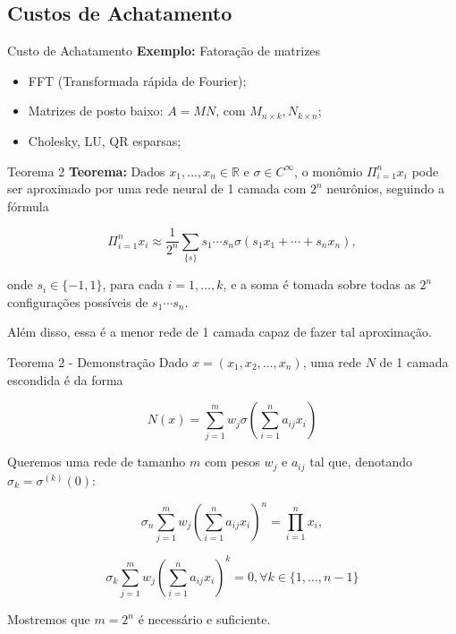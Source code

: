 \documentclass{beamer}
\begin{document}
\subsection{Custos de Achatamento}
\begin{frame}
    \tableofcontents[currentsection]
\end{frame}

\begin{frame}{Custo de Achatamento}
    \textbf{Exemplo:} Fatoração de matrizes
    \begin{itemize}
        \item FFT (Transformada rápida de Fourier);
        \item Matrizes de posto baixo: $A = MN$, com $M_{n\times k}, N_{k \times n}$;
        \item Cholesky, LU, QR esparsas;  
    \end{itemize}
\end{frame}

\begin{frame}{Teorema 2}
    \textbf{Teorema:} Dados $x_1,\dots,x_n \in \mathbb R$ e $\sigma \in C^\infty$, o monômio $\Pi_{i=1}^n x_i$ pode ser aproximado por uma rede neural de 1 camada com $2^n$ neurônios, seguindo a fórmula

    \[
        \Pi_{i=1}^n x_i \approx \frac{1}{2^n} \sum_{\{s\}}s_1 \cdots s_n \sigma(s_1 x_1 + \cdots + s_n x_n),
    \]

    onde $s_i \in \{-1,1\}$, para cada $i = 1,\dots,k$, e a soma é tomada sobre todas as $2^n$ configurações possíveis de $s_1 \cdots s_n$.

    \pause

    Além disso, essa é a menor rede de 1 camada capaz de fazer tal aproximação.

\end{frame}

\begin{frame}{Teorema 2 - Demonstração}
    \small
    Dado $x = (x_1,x_2, \dots, x_n)$, uma rede $N$ de 1 camada escondida é da forma

    \[
        N(x) = \sum_{j=1}^m w_j \sigma \left(\sum_{i=1}^n a_{ij} x_i \right)
    \]

    \pause

    Queremos uma rede de tamanho $m$ com pesos $w_j$ e $a_{ij}$ tal que, denotando $\sigma_k = \sigma^(k)(0)$:
    
    \begin{equation} 
        \sigma_n \sum_{j=1}^{m} w_j \left( \sum_{i=1}^{n} a_{ij} x_i \right)^{n} = \prod_{i=1}^{n} x_i,
    \end{equation}
    
    \begin{equation}
        \sigma_k \sum_{j=1}^{m} w_j \left( \sum_{i=1}^{n} a_{ij} x_i \right)^{k} = 0, \forall k \in \{1, \dots, n-1\}
    \end{equation}

    \pause

    Mostremos que $m=2^n$ é necessário e suficiente.

\end{frame}
\end{document}

